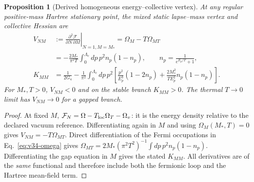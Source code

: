 \documentclass[11pt,a4paper]{article}
\newtheorem{proposition}[theorem]{Proposition}
\theoremstyle{remark}\newtheorem{remark}[theorem]{Remark}
\begin{document}
\begin{proposition}[Derived homogeneous energy--collective vertex]
\label{prop:v34-energyvertex}
At any regular positive-mass Hartree stationary point, the mixed static
lapse--mass vertex and collective Hessian are
\begin{equation}\label{eq:v34-V}
\boxed{\begin{aligned}
V_{NM}&:=\left.\frac{\partial^2\mathcal F}{\partial N\,\partial M}
\right|_{N=1,M=M_*}
=\Omega_M-T\Omega_{MT}\\
&=-\frac{2M_*}{\pi^2 T}\int_0^{\Lambda_c}dp\,p^2 n_p(1-n_p),
\qquad n_p=\frac{1}{e^{E_p/T}+1},
\\ K_{MM}&=\frac{1}{2G_4}-\frac{1}{\pi^2}
\int_0^{\Lambda_c}dp\,p^2\left[
\frac{p^2}{E_p^3}(1-2n_p)
+\frac{2M_*^2}{T E_p^2}n_p(1-n_p)\right].
\end{aligned}}
\end{equation}
For $M_*,T>0$, $V_{NM}<0$ and on the stable branch $K_{MM}>0$.
The thermal $T\to0$ limit has $V_{NM}\to0$ for a gapped branch.
\end{proposition}
\begin{proof}
At fixed $M$, $\mathcal F_N=\Omega-T_{\rm loc}\Omega_T-\Omega_v$:
it is the energy density relative to the declared vacuum reference.
Differentiating again in $M$ and using $\Omega_M(M_*,T)=0$ gives
$V_{NM}=-T\Omega_{MT}$. Direct differentiation of the Fermi occupations
in Eq.~\eqref{eq:v34-omega} gives
$\Omega_{MT}=2M_*(\pi^2T^2)^{-1}\int dp\,p^2n_p(1-n_p)$.
Differentiating the gap equation in $M$ gives the stated $K_{MM}$.
All derivatives are of the \emph{same} functional and therefore include
both the fermionic loop and the Hartree mean-field term.
\end{proof}
\end{document}
